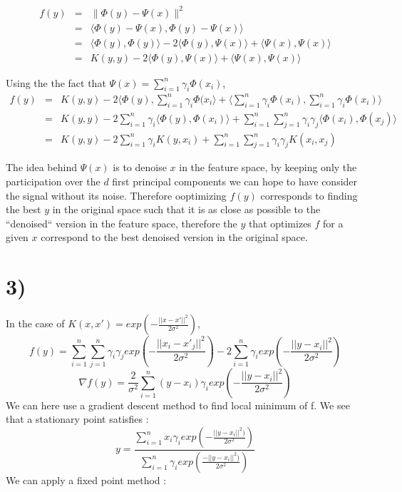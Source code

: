 \begin{eqnarray*}
	f(y) &=& \|\Phi(y) - \Psi(x) \|^2\\
	&=& \langle \Phi(y) - \Psi(x), \Phi(y) - \Psi(x) \rangle \\
	&=& \langle \Phi(y), \Phi(y) \rangle -  2 \langle \Phi(y), \Psi(x) \rangle + \langle \Psi(x), \Psi(x) \rangle\\
	&=& K(y,y) -  2 \langle \Phi(y), \Psi(x) \rangle + \langle \Psi(x), \Psi(x) \rangle
\end{eqnarray*}

Using the the fact that $\Psi(x) = \sum_{i=1}^n \gamma_i \Phi(x_i)$,
\begin{eqnarray*}
	f(y) &=& K(y,y) - 2\langle \Phi(y), \sum_{i=1}^n \gamma_i \Phi(x_i \rangle + \langle \sum_{i=1}^n \gamma_i \Phi(x_i), \sum_{i=1}^n \gamma_i \Phi(x_i) \rangle \\
	&=& K(y,y) - 2\sum_{i=1}^n \gamma_i \langle \Phi(y), \Phi(x_i) \rangle + \sum_{i=1}^n \sum_{j=1}^n \gamma_i\gamma_j\langle  \Phi(x_i),  \Phi(x_j) \rangle \\
	&=& K(y,y) - 2\sum_{i=1}^n \gamma_i K(y,x_i) + \sum_{i=1}^n \sum_{j=1}^n \gamma_i\gamma_j K(x_i,x_j)
\end{eqnarray*}

The idea behind $\Psi(x)$ is to denoise $x$ in the feature space, by keeping only the participation over the $d$ first principal components we can hope to have consider the signal without its noise. Therefore ooptimizing $f(y)$ corresponds to finding the best $y$ in the original space such that it is as close as possible to the ``denoised`` version in the feature space, therefore the $y$ that optimizes $f$ for a given $x$ correspond to the best denoised version in the original space.

\section*{3)}
In the case of $K(x,x')=exp(-\frac{||x-x'||^{2}}{2\sigma^{2}})$,
$$f(y)=\sum_{i=1}^{n}\sum_{j=1}^{n}\gamma_{i}\gamma_{j}exp(-\frac{||x_{i}-x'_{j}||^{2}}{2\sigma^{2}})-2\sum_{i=1}^{n}\gamma_{i}exp(-\frac{||y-x_{i}||^{2}}{2\sigma^{2}})$$
$$\nabla f(y)=\frac{2}{\sigma^{2}}\sum_{i=1}^{n}(y-x_{i})\gamma_{i}exp(-\frac{||y-x_{i}||^{2}}{2\sigma^{2}})$$
We can here use a gradient descent method to find local minimum of f. We see that a stationary point satisfies : 
$$y=\frac{\sum_{i=1}^{n}x_{i}\gamma_{i}exp(-\frac{||y-x_{i}||^{2})}{2\sigma^{2}})}{\sum_{i=1}^{n}\gamma_{i}exp(\frac{-||y-x_{i}||^{2})}{2\sigma^{2}})}$$
We can apply a fixed point method :

